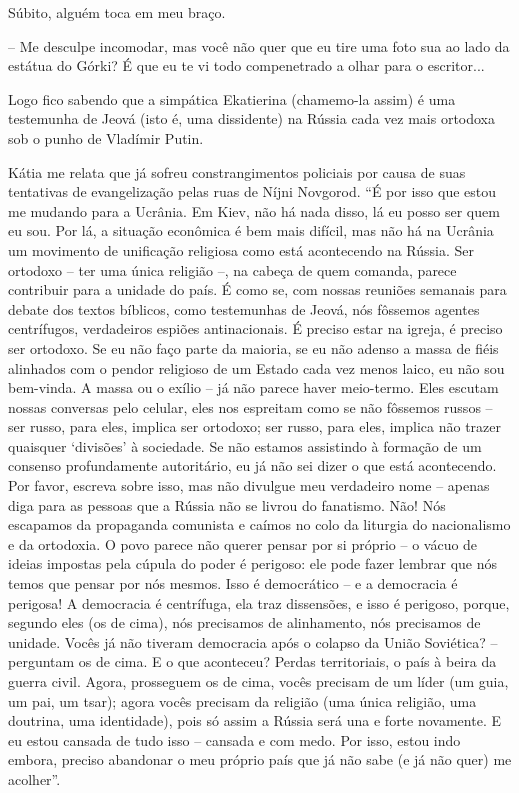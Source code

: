 Súbito, alguém toca em meu braço.

-- Me desculpe incomodar, mas você não quer que eu tire uma foto sua ao
lado da estátua do Górki? É que eu te vi todo compenetrado a olhar para
o escritor...

Logo fico sabendo que a simpática Ekatierina (chamemo-la assim) é uma
testemunha de Jeová (isto é, uma dissidente) na Rússia cada vez mais
ortodoxa sob o punho de Vladímir Putin.

Kátia me relata que já sofreu constrangimentos policiais por causa de
suas tentativas de evangelização pelas ruas de Níjni Novgorod. ``É por
isso que estou me mudando para a Ucrânia. Em Kiev, não há nada disso, lá
eu posso ser quem eu sou. Por lá, a situação econômica é bem mais
difícil, mas não há na Ucrânia um movimento de unificação religiosa como
está acontecendo na Rússia. Ser ortodoxo -- ter uma única religião --,
na cabeça de quem comanda, parece contribuir para a unidade do país. É
como se, com nossas reuniões semanais para debate dos textos bíblicos,
como testemunhas de Jeová, nós fôssemos agentes centrífugos, verdadeiros
espiões antinacionais. É preciso estar na igreja, é preciso ser
ortodoxo. Se eu não faço parte da maioria, se eu não adenso a massa de
fiéis alinhados com o pendor religioso de um Estado cada vez menos
laico, eu não sou bem-vinda. A massa ou o exílio -- já não parece haver
meio-termo. Eles escutam nossas conversas pelo celular, eles nos
espreitam como se não fôssemos russos -- ser russo, para eles, implica
ser ortodoxo; ser russo, para eles, implica não trazer quaisquer
`divisões' à sociedade. Se não estamos assistindo à formação de um
consenso profundamente autoritário, eu já não sei dizer o que está
acontecendo. Por favor, escreva sobre isso, mas não divulgue meu
verdadeiro nome -- apenas diga para as pessoas que a Rússia não se
livrou do fanatismo. Não! Nós escapamos da propaganda comunista e caímos
no colo da liturgia do nacionalismo e da ortodoxia. O povo parece não
querer pensar por si próprio -- o vácuo de ideias impostas pela cúpula
do poder é perigoso: ele pode fazer lembrar que nós temos que pensar por
nós mesmos. Isso é democrático -- e a democracia é perigosa! A
democracia é centrífuga, ela traz dissensões, e isso é perigoso, porque,
segundo eles (os de cima), nós precisamos de alinhamento, nós precisamos
de unidade. Vocês já não tiveram democracia após o colapso da União
Soviética? -- perguntam os de cima. E o que aconteceu? Perdas
territoriais, o país à beira da guerra civil. Agora, prosseguem os de
cima, vocês precisam de um líder (um guia, um pai, um tsar); agora vocês
precisam da religião (uma única religião, uma doutrina, uma identidade),
pois só assim a Rússia será una e forte novamente. E eu estou cansada de
tudo isso -- cansada e com medo. Por isso, estou indo embora, preciso
abandonar o meu próprio país que já não sabe (e já não quer) me
acolher''.

